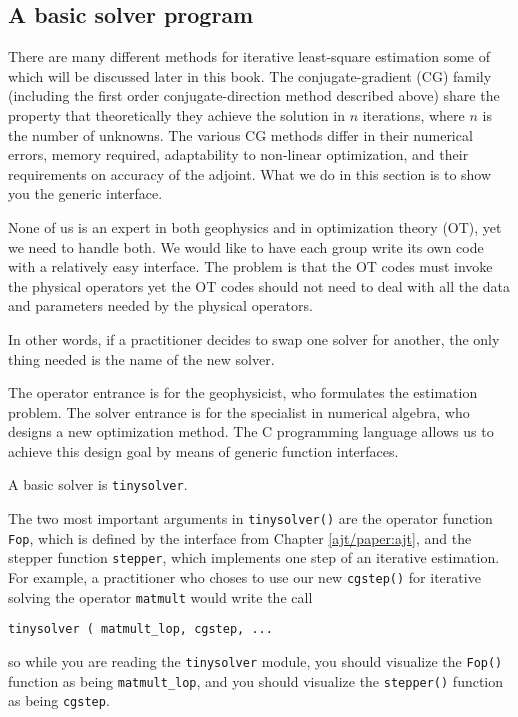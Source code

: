 \subsection{A basic solver program}
There are many different methods for iterative least-square estimation
some of which will be discussed later in this book.
The conjugate-gradient (CG) family
(including the first order conjugate-direction method described above)
share the property that theoretically they achieve the solution
in $n$ iterations, where $n$ is the number of unknowns.
The various CG methods differ
in their numerical errors,
memory required,
adaptability to non-linear optimization,
and their requirements on accuracy of the adjoint.
What we do in this section is to show you the generic interface.
\par
None of us is an expert in both geophysics and in optimization theory (OT),
yet we need to handle both.
We would like to have each group write its own code with
a relatively easy interface.
The problem is that the OT codes must invoke the physical operators
yet the OT codes should not
need to deal with all the data and parameters needed by the physical operators.
\par
In other words,
if a practitioner decides to
swap one solver for another,
the only thing needed is the name of the new solver.
\par
The operator entrance is for the geophysicist,
who formulates the estimation problem.
The solver entrance is for the specialist in numerical algebra,
who designs a new optimization method.
The C programming language allows us
to achieve this design goal by means of generic function interfaces.
\par
A basic solver is \texttt{tinysolver}.


\par
The two most important arguments in \texttt{tinysolver()}
are the operator function \texttt{Fop},
which is defined by the interface from Chapter \ref{ajt/paper:ajt},
and the stepper function \texttt{stepper},
which implements one step of an iterative estimation.
For example, a practitioner who choses to use our new
\texttt{cgstep()} 
for iterative solving the operator
\texttt{matmult} 
would write the call
\par
\texttt{tinysolver ( matmult\_lop, cgstep, ...}
\par\noindent
so while you are reading the \texttt{tinysolver} module,
you should visualize the \texttt{Fop()} function
as being \texttt{matmult\_lop}, and
you should visualize the \texttt{stepper()} function
as being \texttt{cgstep}.

